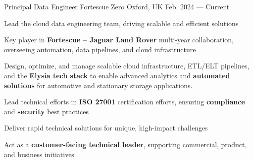 
\begin{cventries}

  \cventry
  {Principal Data Engineer } %
  {Fortescue {\color{awesome-nephritis} Zero} } %
  {Oxford, UK} %
  {Feb. 2024 --- Current} %
  {
    \begin{cvitems} %
    \item {Lead the cloud data engineering team, driving scalable and efficient solutions}
    \item {Key player in \textbf{Fortescue -- Jaguar Land Rover} multi-year collaboration, overseeing automation, data pipelines, and cloud infrastructure}
    \item {Design, optimize, and manage scalable cloud infrastructure, ETL/ELT pipelines, and the \textbf{Elysia tech stack} to enable advanced analytics and \textbf{automated solutions} for automotive and stationary storage applications.}
    \item {Lead technical efforts in \textbf{ISO 27001} certification efforts, ensuring \textbf{compliance} and \textbf{security} best practices}
    \item {Deliver rapid technical solutions for unique, high-impact challenges}
    \item {Act as a \textbf{customer-facing technical leader}, supporting commercial, product, and business initiatives}
    \end{cvitems}
  }


\end{cventries}
